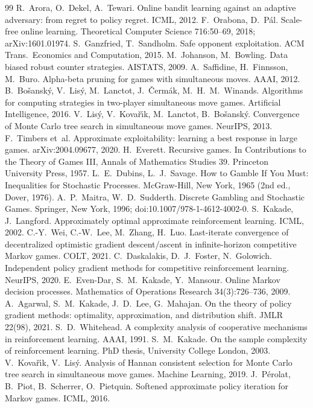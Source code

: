 \documentclass[10pt]{article}
\theoremstyle{plain}
\theoremstyle{definition}
\theoremstyle{remark}
\begin{document}
\begin{thebibliography}{99}
 R.~Arora, O.~Dekel, A.~Tewari. Online bandit learning against an adaptive adversary: from regret to policy regret. ICML, 2012.
 F.~Orabona, D.~P\'al. Scale-free online learning. Theoretical Computer Science 716:50--69, 2018; arXiv:1601.01974.
 S.~Ganzfried, T.~Sandholm. Safe opponent exploitation. ACM Trans.\ Economics and Computation, 2015.
 M.~Johanson, M.~Bowling. Data biased robust counter strategies. AISTATS, 2009.
 A.~Saffidine, H.~Finnsson, M.~Buro. Alpha-beta pruning for games with simultaneous moves. AAAI, 2012.
 B.~Bo\v{s}ansk\'y, V.~Lis\'y, M.~Lanctot, J.~\v{C}erm\'ak, M.~H.~M.~Winands. Algorithms for computing strategies in two-player simultaneous move games. Artificial Intelligence, 2016.
 V.~Lis\'y, V.~Kova\v{r}\'{\i}k, M.~Lanctot, B.~Bo\v{s}ansk\'y. Convergence of Monte Carlo tree search in simultaneous move games. NeurIPS, 2013.
 F.~Timbers et~al. Approximate exploitability: learning a best response in large games. arXiv:2004.09677, 2020.
 H.~Everett. Recursive games. In Contributions to the Theory of Games III, Annals of Mathematics Studies 39. Princeton University Press, 1957.
 L.~E.~Dubins, L.~J.~Savage. How to Gamble If You Must: Inequalities for Stochastic Processes. McGraw-Hill, New York, 1965 (2nd ed., Dover, 1976).
 A.~P.~Maitra, W.~D.~Sudderth. Discrete Gambling and Stochastic Games. Springer, New York, 1996; doi:10.1007/978-1-4612-4002-0. %
 S.~Kakade, J.~Langford. Approximately optimal approximate reinforcement learning. ICML, 2002.
 C.-Y.~Wei, C.-W.~Lee, M.~Zhang, H.~Luo. Last-iterate convergence of decentralized optimistic gradient descent/ascent in infinite-horizon competitive Markov games. COLT, 2021. %
 C.~Daskalakis, D.~J.~Foster, N.~Golowich. Independent policy gradient methods for competitive reinforcement learning. NeurIPS, 2020. %
 E.~Even-Dar, S.~M.~Kakade, Y.~Mansour. Online Markov decision processes. Mathematics of Operations Research 34(3):726--736, 2009.
 A.~Agarwal, S.~M.~Kakade, J.~D.~Lee, G.~Mahajan. On the theory of policy gradient methods: optimality, approximation, and distribution shift. JMLR 22(98), 2021.
 S.~D.~Whitehead. A complexity analysis of cooperative mechanisms in reinforcement learning. AAAI, 1991. %
 S.~M.~Kakade. On the sample complexity of reinforcement learning. PhD thesis, University College London, 2003. %
 V.~Kova\v{r}\'{\i}k, V.~Lis\'y. Analysis of Hannan consistent selection for Monte Carlo tree search in simultaneous move games. Machine Learning, 2019.
 J.~P\'erolat, B.~Piot, B.~Scherrer, O.~Pietquin. Softened approximate policy iteration for Markov games. ICML, 2016. %
\end{thebibliography}
\end{document}

